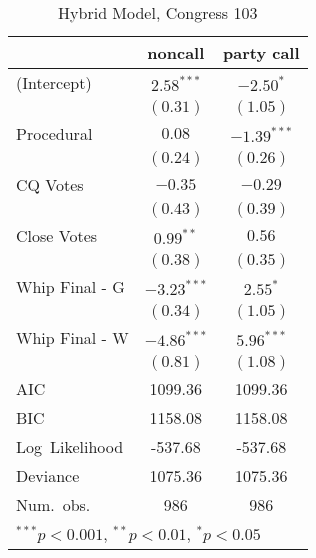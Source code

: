 \documentclass[12pt]{article}
\begin{document}
\begin{table}
	\begin{center}
		\begin{tabular}{l c c }
			\hline
			& noncall & party call \\
			\hline
			(Intercept)      & $2.58^{***}$  & $-2.50^{*}$   \\
			& $(0.31)$      & $(1.05)$      \\
			Procedural       & $0.08$        & $-1.39^{***}$ \\
			& $(0.24)$      & $(0.26)$      \\
			CQ Votes    & $-0.35$       & $-0.29$       \\
			& $(0.43)$      & $(0.39)$      \\
			Close Votes & $0.99^{**}$   & $0.56$        \\
			& $(0.38)$      & $(0.35)$      \\
			Whip Final - G     & $-3.23^{***}$ & $2.55^{*}$    \\
			& $(0.34)$      & $(1.05)$      \\
			Whip Final - W     & $-4.86^{***}$ & $5.96^{***}$  \\
			& $(0.81)$      & $(1.08)$      \\
			\hline
			AIC              & 1099.36       & 1099.36       \\
			BIC              & 1158.08       & 1158.08       \\
			Log\ Likelihood  & -537.68       & -537.68       \\
			Deviance         & 1075.36       & 1075.36       \\
			Num.\ obs.       & 986           & 986           \\
			\hline
			\multicolumn{3}{l}{\scriptsize{$^{***}p<0.001$, $^{**}p<0.01$, $^*p<0.05$}}
		\end{tabular}
		\caption{Hybrid Model, Congress 103}
	\end{center}
\end{table}
\end{document}
